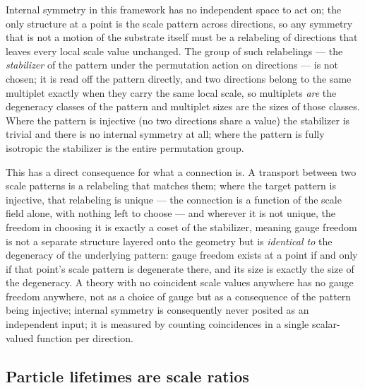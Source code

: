 \documentclass[pdflatex,sn-mathphys-num]{sn-jnl}
\theoremstyle{thmstyleone}
\theoremstyle{thmstylethree}
\theoremstyle{thmstyletwo}
\begin{document}
Internal symmetry in this framework has no independent space to act on;
the only structure at a point is the scale pattern across directions, so
any symmetry that is not a motion of the substrate itself must be a
relabeling of directions that leaves every local scale value unchanged.
The group of such relabelings — the \emph{stabilizer} of the pattern
under the permutation action on directions — is not chosen; it is read
off the pattern directly, and two directions belong to the same
multiplet exactly when they carry the same local scale, so multiplets
\emph{are} the degeneracy classes of the pattern and multiplet sizes are
the sizes of those classes. Where the pattern is injective (no two
directions share a value) the stabilizer is trivial and there is no
internal symmetry at all; where the pattern is fully isotropic the
stabilizer is the entire permutation group.

This has a direct consequence for what a connection is. A transport
between two scale patterns is a relabeling that matches them; where the
target pattern is injective, that relabeling is unique — the connection
is a function of the scale field alone, with nothing left to choose —
and wherever it is not unique, the freedom in choosing it is exactly a
coset of the stabilizer, meaning gauge freedom is not a separate
structure layered onto the geometry but is \emph{identical to} the
degeneracy of the underlying pattern: gauge freedom exists at a point if
and only if that point's scale pattern is degenerate there, and its size
is exactly the size of the degeneracy. A theory with no coincident scale
values anywhere has no gauge freedom anywhere, not as a choice of gauge
but as a consequence of the pattern being injective; internal symmetry is
consequently never posited as an independent input; it is measured by
counting coincidences in a single scalar-valued function per direction.

\subsection{Particle lifetimes are scale ratios}
\end{document}
